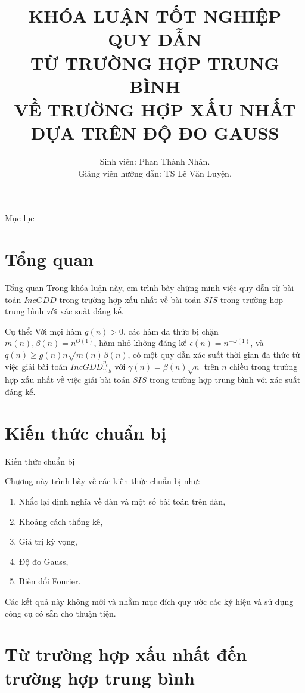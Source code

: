 \documentclass[notheorems,envcountsect,serif,12pt]{beamer}
\title[\bf LUẬN VĂN TỐT NGHIỆP]{\small {KHÓA LUẬN TỐT NGHIỆP} \\
\small QUY DẪN\\TỪ TRƯỜNG HỢP TRUNG BÌNH\\VỀ TRƯỜNG HỢP XẤU NHẤT\\ DỰA TRÊN ĐỘ ĐO GAUSS}
\author[Phan Thành Nhân]{ Sinh viên: Phan Thành Nhân.\\
Giảng viên hướng dẫn: TS Lê Văn Luyện.}
\institute[HCMUS]{ĐẠI HỌC KHOA HỌC TỰ NHIÊN TP. HỒ CHÍ MINH}
\numberwithin{equation}{section}
\theoremstyle{definition}
\numberwithin{equation}{section}
\begin{document}
	\fontsize{12pt}{10pt}\selectfont
	\frame{\maketitle}
	\begin{frame}{Mục lục}
	\tableofcontents
\end{frame}
\section{Tổng quan}
\begin{frame}{Tổng quan}
Trong khóa luận này, em trình bày chứng minh việc quy dẫn từ bài toán $IncGDD$ trong trường hợp xấu nhất về bài toán $SIS$ trong trường hợp trung bình với xác suất đáng kể.\pause 

\begin{block}{Cụ thể:}
	Với mọi hàm $g(n)>0$, các hàm đa thức bị chặn $m(n), \beta(n)=n^{O(1)}$, hàm nhỏ không đáng kể $\epsilon(n)=n^{-\omega(1)}$, và $q(n)\ge g(n)n\sqrt{m(n)}\beta(n)$, có một quy dẫn xác suất thời gian đa thức từ việc giải bài toán $IncGDD_{\gamma, g}^{\eta_\epsilon}$ với $\gamma(n)=\beta(n)\sqrt{n}$ trên $n$ chiều trong trường hợp xấu nhất về việc giải bài toán $SIS$ trong trường hợp trung bình với xác suất đáng kể.	
\end{block}
\end{frame}

\section{Kiến thức chuẩn bị}
\begin{frame}{Kiến thức chuẩn bị}
\begin{block}\quad
	Chương này trình bày về các kiến thức chuẩn bị như:
	\begin{enumerate}
		\item Nhắc lại định nghĩa về dàn và một số bài toán trên dàn,
		\item Khoảng cách thống kê,
		\item Giá trị kỳ vọng,
		\item Độ đo Gauss,
		\item Biến đổi Fourier. 
	\end{enumerate} 
	Các kết quả này không mới và nhằm mục đích quy ước các ký hiệu và sử dụng công cụ có sẵn cho thuận tiện.
\end{block}
\end{frame}
\section{Từ trường hợp xấu nhất đến trường hợp trung bình}
\end{document}
